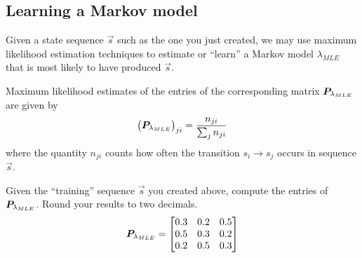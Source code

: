 
\color{black}
\subsection*{Learning a Markov model}

Given a state sequence $\vec{s}$ such as the one you just created, we may use maximum likelihood estimation techniques to estimate or ``learn'' a Markov model $\lambda_{MLE}$ that is most likely to have produced $\vec{s}$.

Maximum likelihood estimates of the entries of the corresponding matrix $\bm{P}_{\lambda_{MLE}}$ are given by
\begin{equation*}
\bigl( \bm{P}_{\lambda_{MLE}} \bigr)_{ji} = \frac{n_{ji}}{\sum_j n_{ji}}
\end{equation*}
where the quantity $n_{ji}$ counts how often the transition $s_i \rightarrow s_j$ occurs in sequence $\vec{s}$.

Given the ``training'' sequence $\vec{s}$ you created above, compute the entries of $\bm{P}_{\lambda_{MLE}}$. Round your results to two decimals.
\color{blue}
\begin{equation*}
\bm{P}_{\lambda_{MLE}} = \begin{bmatrix} 0.3 & 0.2 & 0.5 \\ 0.5 & 0.3 & 0.2 \\ 0.2 & 0.5 & 0.3 \end{bmatrix}
\end{equation*}
\color{black}



